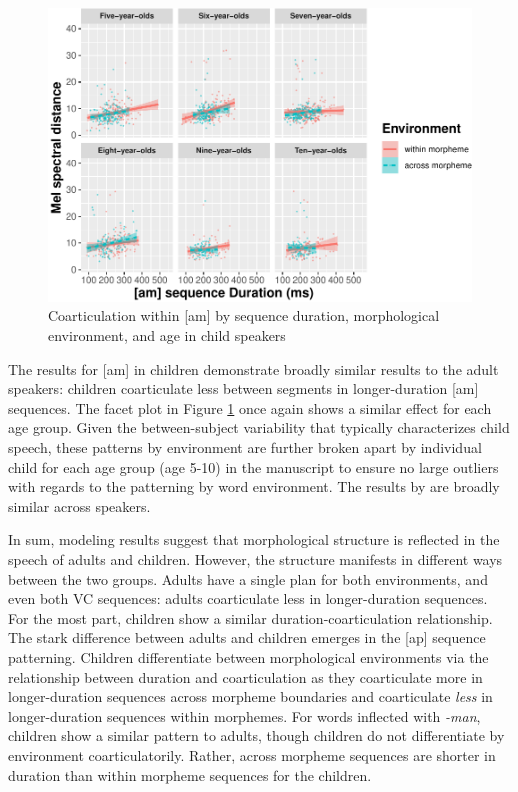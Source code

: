 \documentclass[
]{article}
\begin{document}
\begin{figure}
\centering
\includegraphics{supp_analysis_files/figure-latex/child-facet-am-1.pdf}
\caption{\label{fig:child-facet-am}Coarticulation within {[}am{]} by sequence duration, morphological environment, and age in child speakers}
\end{figure}

The results for {[}am{]} in children demonstrate broadly similar results to the adult speakers: children coarticulate less between segments in longer-duration {[}am{]} sequences. The facet plot in Figure \ref{fig:child-facet-am} once again shows a similar effect for each age group. Given the between-subject variability that typically characterizes child speech, these patterns by environment are further broken apart by individual child for each age group (age 5-10) in the manuscript to ensure no large outliers with regards to the patterning by word environment. The results by are broadly similar across speakers.

In sum, modeling results suggest that morphological structure is reflected in the speech of adults and children. However, the structure manifests in different ways between the two groups. Adults have a single plan for both environments, and even both VC sequences: adults coarticulate less in longer-duration sequences. For the most part, children show a similar duration-coarticulation relationship. The stark difference between adults and children emerges in the {[}ap{]} sequence patterning. Children differentiate between morphological environments via the relationship between duration and coarticulation as they coarticulate more in longer-duration sequences across morpheme boundaries and coarticulate \emph{less} in longer-duration sequences within morphemes. For words inflected with \emph{-man}, children show a similar pattern to adults, though children do not differentiate by environment coarticulatorily. Rather, across morpheme sequences are shorter in duration than within morpheme sequences for the children.
\end{document}
